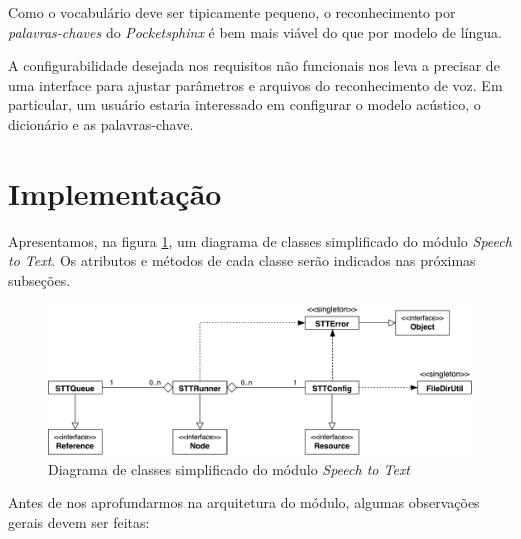 Como o vocabulário deve ser tipicamente pequeno, o reconhecimento por \emph{palavras-chaves} do \textit{Pocketsphinx} é bem mais viável do que por modelo de língua.

A configurabilidade desejada nos requisitos não funcionais nos leva a precisar de uma interface para ajustar parâmetros e arquivos do reconhecimento de voz. Em particular, um usuário estaria interessado em configurar o modelo acústico, o dicionário e as palavras-chave.


\section{Implementação}

Apresentamos, na figura \ref{sttModuleClassDiagram}, um diagrama de classes simplificado do módulo \textit{Speech to Text}. Os atributos e métodos de cada classe serão indicados nas próximas subseções.

\begin{figure}[H]
  \centering
  \includegraphics[width=\textwidth]{image/stt-module-simple.pdf}
  \caption{Diagrama de classes simplificado do módulo \textit{Speech to Text}}
  \label{sttModuleClassDiagram}
\end{figure}

Antes de nos aprofundarmos na arquitetura do módulo, algumas observações gerais devem ser feitas:

